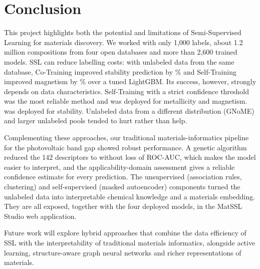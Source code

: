 \clearpage
\section{Conclusion}

This project highlights both the potential and limitations of Semi-Supervised Learning for
materials discovery. We worked with only 1,000 labels, about 1.2 million compositions from
four open databases and more than 2,600 trained models. SSL can reduce labelling costs: with
unlabeled data from the same database, Co-Training improved stability prediction by
\StabInImpr\% and Self-Training improved magnetism by \MagInImpr\% over a tuned LightGBM.
Its success, however, strongly depends on data characteristics. Self-Training with a strict
confidence threshold was the most reliable method and was deployed for metallicity and
magnetism. \StabSelMethod{} was deployed for stability. Unlabeled data from a different
distribution (GNoME) and larger unlabeled pools tended to hurt rather than help.

Complementing these approaches, our traditional materials-informatics pipeline for the
photovoltaic band gap showed robust performance. A genetic algorithm reduced the 142
descriptors to \GAFinalN{} without loss of ROC-AUC, which makes the model easier to
interpret, and the applicability-domain assessment gives a reliable confidence estimate for
every prediction. The unsupervised (association rules, clustering) and self-supervised (masked
autoencoder) components turned the unlabeled data into interpretable chemical knowledge and a
materials embedding. They are all exposed, together with the four deployed models, in the
MatSSL Studio web application.

Future work will explore hybrid approaches that combine the data efficiency of SSL with the
interpretability of traditional materials informatics, alongside active learning,
structure-aware graph neural networks and richer representations of materials.

